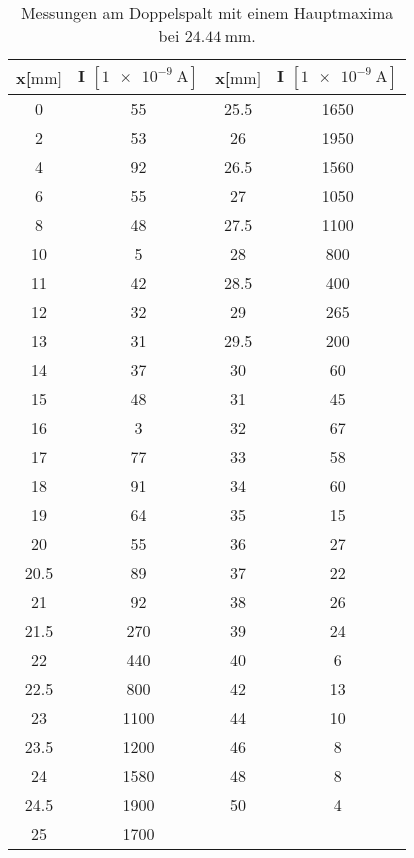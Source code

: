 \begin{table}
    \centering
    \caption{Messungen am Doppelspalt mit einem Hauptmaxima bei $\SI{24.44}{\mm}$.}
    \label{tab:doppel}
    \begin{tabular}{c c || c c}
        \toprule
        x[$\si{\mm}]$  & I $[\SI{1e-9}{\ampere}]$ &  x[$\si{\mm}]$  & I $[\SI{1e-9}{\ampere}]$\\
        \midrule
        0      &     55  &    25.5   &    1650   \\ 
        2      &     53  &    26     &    1950   \\ 
        4      &     92  &    26.5   &    1560   \\ 
        6      &     55  &    27     &    1050   \\ 
        8      &     48  &    27.5   &    1100   \\ 
        10     &     5   &    28     &    800    \\
        11     &     42  &    28.5   &    400    \\ 
        12     &     32  &    29     &    265    \\ 
        13     &     31  &    29.5   &    200    \\ 
        14     &     37  &    30     &    60     \\ 
        15     &     48  &    31     &    45     \\ 
        16     &     3   &    32     &    67     \\
        17     &     77  &    33     &    58     \\ 
        18     &     91  &    34     &    60     \\ 
        19     &     64  &    35     &    15     \\ 
        20     &     55  &    36     &    27     \\ 
        20.5   &     89  &    37     &    22     \\ 
        21     &     92  &    38     &    26     \\ 
        21.5   &     270  &    39     &    24     \\ 
        22     &     440  &    40     &    6      \\ 
        22.5   &     800  &    42     &    13     \\ 
        23     &     1100 &     44    &     10    \\  
        23.5   &     1200 &     46    &     8     \\  
        24     &     1580 &     48    &     8     \\  
        24.5   &     1900 &     50    &     4     \\  
        25     &     1700 &     ~ & ~ \\
       \bottomrule
    \end{tabular}
\end{table}          
          
